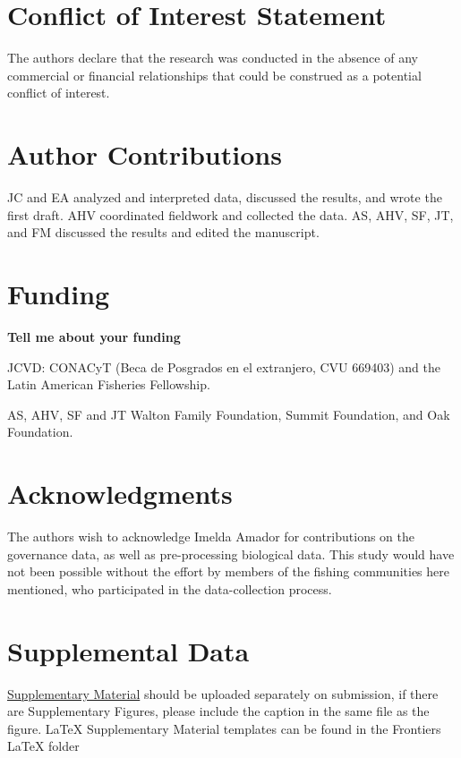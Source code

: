 \documentclass{frontiersSCNS}
\theoremstyle{definition}
\theoremstyle{definition}
\theoremstyle{definition}
\theoremstyle{remark}
\begin{document}
\section*{Conflict of Interest Statement}

The authors declare that the research was conducted in the absence of
any commercial or financial relationships that could be construed as a
potential conflict of interest.

\section*{Author Contributions}

JC and EA analyzed and interpreted data, discussed the results, and
wrote the first draft. AHV coordinated fieldwork and collected the data.
AS, AHV, SF, JT, and FM discussed the results and edited the manuscript.

\section*{Funding}

\textbf{Tell me about your funding}

JCVD: CONACyT (Beca de Posgrados en el extranjero, CVU 669403) and the
Latin American Fisheries Fellowship.

AS, AHV, SF and JT Walton Family Foundation, Summit Foundation, and Oak
Foundation.

\section*{Acknowledgments}

The authors wish to acknowledge Imelda Amador for contributions on the
governance data, as well as pre-processing biological data. This study
would have not been possible without the effort by members of the
fishing communities here mentioned, who participated in the
data-collection process.

\section*{Supplemental Data}

\href{http://home.frontiersin.org/about/author-guidelines#SupplementaryMaterial}{Supplementary Material}
should be uploaded separately on submission, if there are Supplementary
Figures, please include the caption in the same file as the figure.
LaTeX Supplementary Material templates can be found in the Frontiers
LaTeX folder
\end{document}
